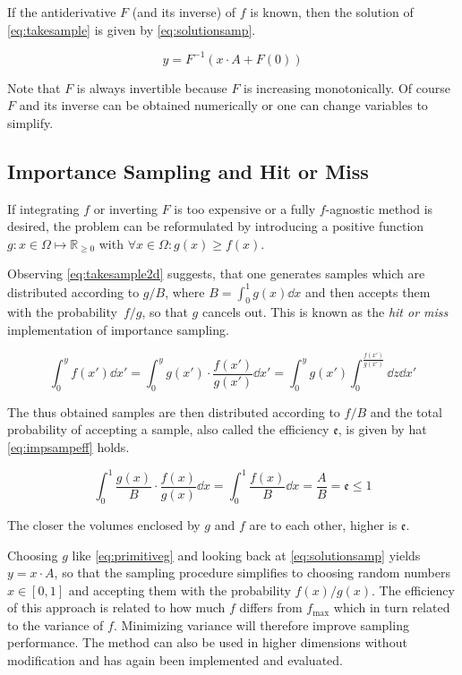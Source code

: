If the antiderivative \(F\) (and its inverse) of \(f\) is known, then
the solution of \cref{eq:takesample} is given by
\cref{eq:solutionsamp}.

\begin{equation}
  \label{eq:solutionsamp}
  y = F^{-1}(x\cdot A + F(0))
\end{equation}

Note that \(F\) is always invertible because \(F\) is
increasing monotonically. Of course \(F\) and its inverse can be
obtained numerically or one can change variables to simplify.

\subsection{Importance Sampling and Hit or Miss}%
\label{sec:hitmiss}
If integrating \(f\) or inverting \(F\) is too expensive or a fully
\(f\)-agnostic method is desired, the problem can be reformulated by
introducing a positive function
\(g\colon x\in\Omega\mapsto\mathbb{R}_{\geq 0}\) with
\(\forall x\in\Omega\colon g(x)\geq f(x)\).

Observing \cref{eq:takesample2d} suggests, that one generates samples
which are distributed according to \(g/B\), where
\(B=\int_0^1g(x)\dd{x}\) and then accepts them with the
probability~\(f/g\), so that \(g\) cancels out. This is known as the
\emph{hit or miss} implementation of importance sampling.

\begin{equation}
  \label{eq:takesample2d}
  \int_{0}^{y}f(x')\dd{x'} =
  \int_{0}^{y}g(x')\cdot\frac{f(x')}{g(x')}\dd{x'}
  = \int_{0}^{y}g(x')\int_{0}^{\frac{f(x')}{g(x')}}\dd{z}\dd{x'}
\end{equation}

The thus obtained samples are then distributed according to \(f/B\)
and the total probability of accepting a sample, also called the
efficiency \(\mathfrak{e}\), is given by hat \cref{eq:impsampeff}
holds.

\begin{equation}
  \label{eq:impsampeff}
  \int_0^1\frac{g(x)}{B}\cdot\frac{f(x)}{g(x)}\dd{x} = \int_0^1\frac{f(x)}{B}\dd{x} = \frac{A}{B} = \mathfrak{e}\leq 1
\end{equation}

The closer the volumes enclosed by \(g\) and \(f\) are to each other,
higher is \(\mathfrak{e}\).

Choosing \(g\) like \cref{eq:primitiveg} and looking back at
\cref{eq:solutionsamp} yields \(y = x\cdot A\), so that the sampling
procedure simplifies to choosing random numbers \(x\in [0,1]\) and
accepting them with the probability \(f(x)/g(x)\). The efficiency of
this approach is related to how much \(f\) differs from
\(f_{\text{max}}\) which in turn related to the variance of
\(f\). Minimizing variance will therefore improve sampling
performance. The method can also be used in higher dimensions without
modification and has again been implemented and evaluated.

